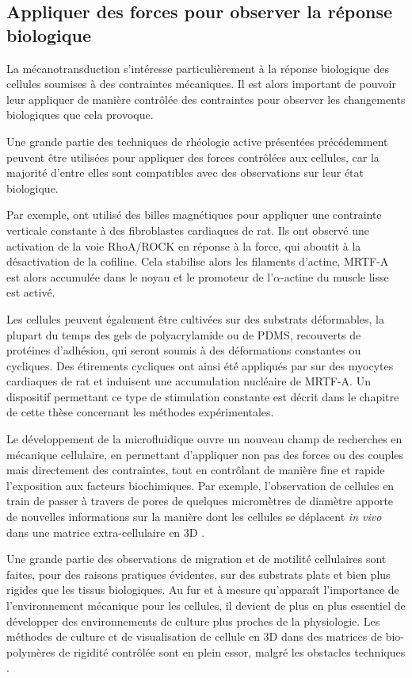 \subsection{Appliquer des forces pour observer la réponse biologique}

La mécanotransduction s'intéresse particulièrement à la réponse biologique des cellules soumises à des contraintes mécaniques. 
Il est alors important de pouvoir leur appliquer de manière contrôlée des contraintes pour observer les changements biologiques que cela provoque. 

Une grande partie des techniques de rhéologie active présentées précédemment peuvent être utilisées pour appliquer des forces contrôlées aux cellules, car la majorité d'entre elles sont compatibles avec des observations sur leur état biologique.

Par exemple, \cite{zhao_force_2007} ont utilisé des billes magnétiques pour appliquer une contrainte verticale constante à des fibroblastes cardiaques de rat. Ils ont observé une activation de la voie RhoA/ROCK en réponse à la force, qui aboutit à la désactivation de la cofiline. Cela stabilise alors les filaments d'actine, MRTF-A est alors accumulée dans le noyau et le promoteur de l'$\alpha$-actine  du muscle lisse est activé. 

Les cellules peuvent également être cultivées sur des substrats déformables, la plupart du temps des gels de polyacrylamide ou de PDMS, recouverts de protéines d'adhésion, qui seront soumis à des déformations constantes ou cycliques. Des étirements cycliques ont ainsi été appliqués par \cite{kuwahara_myocardin-related_2010} sur des myocytes cardiaques de rat et induisent une accumulation nucléaire de MRTF-A. 
Un dispositif permettant ce type de stimulation constante est décrit dans le chapitre de cette thèse concernant les méthodes expérimentales.  


Le développement de la microfluidique ouvre un nouveau champ de recherches en mécanique cellulaire, en permettant d'appliquer non pas des forces ou des couples mais directement des contraintes, tout en contrôlant de manière fine et rapide l'exposition aux facteurs biochimiques. 
Par exemple, l'observation de cellules en train de passer à travers de pores de quelques micromètres de diamètre apporte de nouvelles informations sur la manière dont les cellules se déplacent \textit{in vivo} dans une matrice extra-cellulaire en 3D \parencite{aubry_computational_2015}. 

Une grande partie des observations de migration et de motilité cellulaires sont faites, pour des raisons pratiques évidentes, sur des substrats plats et bien plus rigides que les tissus biologiques. Au fur et à mesure qu'apparaît l'importance de l'environnement mécanique pour les cellules, il devient de plus en plus essentiel de développer des environnements de culture plus proches de la physiologie. Les méthodes de culture et de visualisation de cellule en 3D dans des matrices de bio-polymères de rigidité contrôlée sont en plein essor, malgré les obstacles techniques \parencite{fischer_stiffness-controlled_2012}. 

%


